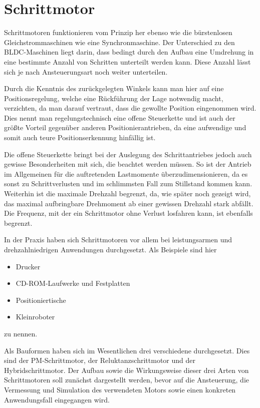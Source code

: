 \chapter{Schrittmotor}

Schrittmotoren funktionieren vom Prinzip her ebenso wie die bürstenlosen Gleichstrommaschinen wie eine Synchronmaschine. Der Unterschied zu den BLDC-Maschinen liegt darin, dass bedingt durch den Aufbau eine Umdrehung in eine bestimmte Anzahl von Schritten unterteilt werden kann. Diese Anzahl lässt sich je nach Ansteuerungsart noch weiter unterteilen.

Durch die Kenntnis des zurückgelegten Winkels kann man hier auf eine Positionsregelung, welche eine Rückführung der Lage notwendig macht, verzichten, da man darauf vertraut, dass die gewollte Position eingenommen wird. Dies nennt man regelungstechnisch eine offene Steuerkette und ist auch der größte Vorteil gegenüber anderen Positionierantrieben, da eine aufwendige und somit auch teure Positionserkennung hinfällig ist.

Die offene Steuerkette bringt bei der Auslegung des Schrittantriebes jedoch auch gewisse Besonderheiten mit sich, die beachtet werden müssen. So ist der Antrieb im Allgemeinen für die auftretenden Lastmomente überzudimensionieren, da es sonst zu Schrittverlusten und im schlimmsten Fall zum Stillstand kommen kann. Weiterhin ist die maximale Drehzahl begrenzt, da, wie später noch gezeigt wird, das maximal aufbringbare Drehmoment ab einer gewissen Drehzahl stark abfällt. Die Frequenz, mit der ein Schrittmotor ohne Verlust losfahren kann, ist ebenfalls begrenzt.

In der Praxis haben sich Schrittmotoren vor allem bei leistungsarmen und drehzahlniedrigen Anwendungen durchgesetzt. Als Beispiele sind hier

\begin{itemize}
	\item Drucker
	\item CD-ROM-Laufwerke und Festplatten
	\item Positioniertische
	\item Kleinroboter
\end{itemize}

zu nennen.

Als Bauformen haben sich im Wesentlichen drei verschiedene durchgesetzt. Dies sind der PM-Schrittmotor, der Reluktanzschrittmotor und der Hybridschrittmotor. Der Aufbau sowie die Wirkungsweise dieser drei Arten von Schrittmotoren soll zunächst dargestellt werden, bevor auf die Ansteuerung, die Vermessung und Simulation des verwendeten Motors sowie einen konkreten Anwendungsfall eingegangen wird.

